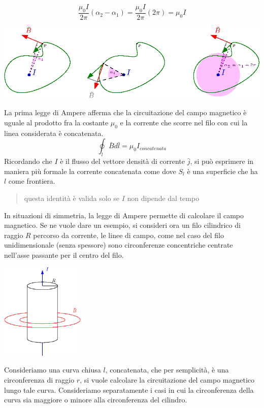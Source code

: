 \documentclass[10pt, letterpaper]{report}
\begin{document}
$$ \frac{\mu_0I}{2\pi}(\alpha_2-\alpha_1)= \frac{\mu_0I}{2\pi}(2\pi)=\mu_0I $$
\begin{center}
    \includegraphics[width=1\textwidth ]{images/CircuitazioneCampoMagnetico2.eps}
\end{center}
La prima legge di Ampere afferma che la circuitazione del campo magnetico è uguale al prodotto fra la costante $\mu_0$ e la corrente che scorre nel filo con cui la linea considerata è concatenata.
$$\oint_l \bar B d\bar l = \mu_0I_{concatenata} $$
Ricordando che $I$ è il flusso del vettore densità di corrente $\bar j$, si può esprimere in maniera più formale la corrente concatenata come 
dove $S_l$ è una superficie che ha 
$l$ come frontiera.\begin{quote}
    questa identità è valida solo se $I$ non dipende dal tempo
\end{quote}
In situazioni di simmetria, la legge di Ampere permette di calcolare il campo magnetico. Se ne vuole dare un esempio, si consideri ora un filo cilindrico di raggio $R$ percorso da corrente, le linee di campo, come nel caso del filo unidimensionale (senza spessore) sono circonferenze concentriche centrate nell'asse passante per il centro del filo.
\begin{center}
    \includegraphics[width=0.3\textwidth ]{images/cilindroElettrico.eps}
\end{center}
Consideriamo una curva chiusa $l$, concatenata, che per semplicità, è una circonferenza di raggio $r$, si vuole calcolare la circuitazione del campo magnetico lungo tale curva. Consideriamo separatamente i casi in cui la circonferenza della curva sia maggiore o minore alla circonferenza del cilindro.\acc 
\end{document}
